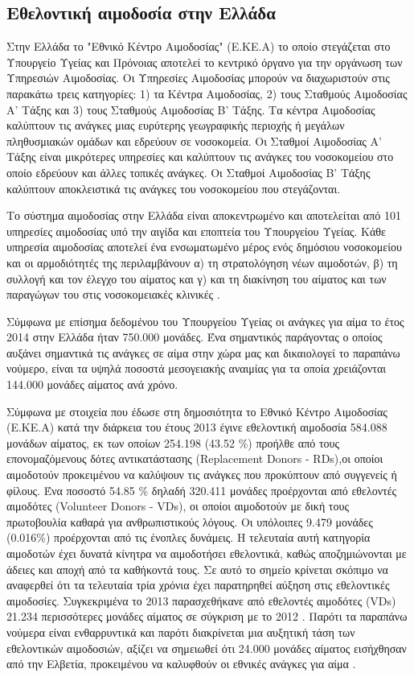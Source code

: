 	\subsection{Εθελοντική αιμοδοσία στην Ελλάδα}
		Στην Ελλάδα το "Εθνικό Κέντρο Αιμοδοσίας" (Ε.ΚΕ.Α) το οποίο στεγάζεται στο Υπουργείο Υγείας και Πρόνοιας αποτελεί το κεντρικό όργανο για την οργάνωση των Υπηρεσιών Αιμοδοσίας. Οι Υπηρεσίες Αιμοδοσίας μπορούν να διαχωριστούν στις παρακάτω τρεις κατηγορίες: 1) τα Κέντρα Αιμοδοσίας, 2) τους Σταθμούς Αιμοδοσίας Α' Τάξης και 3) τους Σταθμούς Αιμοδοσίας Β' Τάξης. Τα κέντρα Αιμοδοσίας καλύπτουν τις ανάγκες μιας ευρύτερης γεωγραφικής περιοχής ή μεγάλων πληθυσμιακών ομάδων και εδρεύουν σε νοσοκομεία. Οι Σταθμοί Αιμοδοσίας Α' Τάξης είναι μικρότερες υπηρεσίες και καλύπτουν τις ανάγκες του νοσοκομείου στο οποίο εδρεύουν και άλλες τοπικές ανάγκες. Οι Σταθμοί Αιμοδοσίας Β' Τάξης καλύπτουν αποκλειστικά τις ανάγκες του νοσοκομείου που στεγάζονται.
		
		Το σύστημα αιμοδοσίας στην Ελλάδα είναι αποκεντρωμένο και αποτελείται από 101 υπηρεσίες αιμοδοσίας υπό την αιγίδα και εποπτεία του Υπουργείου Υγείας\cite{filloKivernisews}. Κάθε υπηρεσία αιμοδοσίας αποτελεί ένα ενσωματωμένο μέρος ενός δημόσιου νοσοκομείου και οι αρμοδιότητές της περιλαμβάνουν α) τη στρατολόγηση νέων αιμοδοτών, β) τη συλλογή και τον έλεγχο του αίματος και γ) και τη διακίνηση του αίματος και των παραγώγων του στις νοσοκομειακές κλινικές \cite{Marantidou2007}.
		
		Σύμφωνα με επίσημα δεδομένου του Υπουργείου Υγείας οι ανάγκες για αίμα το έτος 2014 στην Ελλάδα ήταν 750.000 μονάδες. Ένα σημαντικός παράγοντας ο οποίος αυξάνει σημαντικά τις ανάγκες σε αίμα στην χώρα μας και δικαιολογεί το παραπάνω νούμερο, είναι τα υψηλά ποσοστά μεσογειακής αναιμίας για τα οποία χρειάζονται 144.000 μονάδες αίματος ανά χρόνο. 
		
		Σύμφωνα με στοιχεία που έδωσε στη δημοσιότητα το Εθνικό Κέντρο Αιμοδοσίας (Ε.ΚΕ.Α) κατά την διάρκεια του έτους 2013 έγινε εθελοντική αιμοδοσία 584.088 μονάδων αίματος, εκ των οποίων 254.198 (43.52 \%) προήλθε από τους επονομαζόμενους δότες αντικατάστασης (Replacement Donors - RDs),οι οποίοι αιμοδοτούν προκειμένου να καλύψουν τις ανάγκες που προκύπτουν από συγγενείς ή φίλους. Ένα ποσοστό 54.85 \% δηλαδή 320.411 μονάδες προέρχονται από εθελοντές αιμοδότες (Volunteer Donors - VDs), οι οποίοι αιμοδοτούν με δική τους πρωτοβουλία καθαρά για ανθρωπιστικούς λόγους. Οι υπόλοιπες 9.479 μονάδες (0.016\%) προέρχονται από τις ένοπλες δυνάμεις. Η τελευταία αυτή κατηγορία αιμοδοτών έχει δυνατά κίνητρα να αιμοδοτήσει εθελοντικά, καθώς αποζημιώνονται με άδειες και αποχή από τα καθήκοντά τους. Σε αυτό το σημείο κρίνεται σκόπιμο να αναφερθεί ότι τα τελευταία τρία χρόνια έχει παρατηρηθεί αύξηση στις εθελοντικές αιμοδοσίες. Συγκεκριμένα το 2013 παρασχεθήκανε από εθελοντές αιμοδότες (VDs) 21.234 περισσότερες μονάδες αίματος σε σύγκριση με το 2012 \cite{EKEA}. Παρότι τα παραπάνω νούμερα είναι ενθαρρυντικά και παρότι διακρίνεται μια αυξητική τάση των εθελοντικών αιμοδοσιών, αξίζει να σημειωθεί ότι 24.000 μονάδες αίματος εισήχθησαν από την Ελβετία, προκειμένου να καλυφθούν οι εθνικές ανάγκες για αίμα \cite{Marantidou2007}.
		
